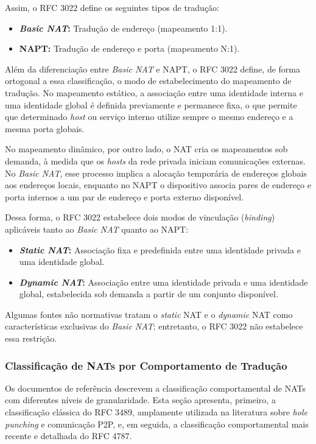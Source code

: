 Assim, o RFC 3022 define os seguintes tipos de tradução:
\begin{itemize}
    \item \textbf{\textit{Basic NAT}:} Tradução de endereço (mapeamento 1:1).
    \item \textbf{NAPT:} Tradução de endereço e porta (mapeamento N:1).
\end{itemize}

Além da diferenciação entre \textit{Basic NAT} e NAPT, o RFC 3022 define, de forma ortogonal a essa classificação, o modo de estabelecimento do mapeamento de tradução. No mapeamento estático, a associação entre uma identidade interna e uma identidade global é definida previamente e permanece fixa, o que permite que determinado \textit{host} ou serviço interno utilize sempre o mesmo endereço e a mesma porta globais.

No mapeamento dinâmico, por outro lado, o NAT cria os mapeamentos sob demanda, à medida que os \textit{hosts} da rede privada iniciam comunicações externas. No \textit{Basic NAT}, esse processo implica a alocação temporária de endereços globais aos endereços locais, enquanto no NAPT o dispositivo associa pares de endereço e porta internos a um par de endereço e porta externo disponível.

Dessa forma, o RFC 3022 estabelece dois modos de vinculação (\textit{binding}) aplicáveis tanto ao \textit{Basic NAT} quanto ao NAPT:
\begin{itemize}
    \item \textbf{\textit{Static NAT}:} Associação fixa e predefinida entre uma identidade privada e uma identidade global.
    \item \textbf{\textit{Dynamic NAT}:} Associação entre uma identidade privada e uma identidade global, estabelecida sob demanda a partir de um conjunto disponível.
\end{itemize}

Algumas fontes não normativas tratam o \textit{static} NAT e o \textit{dynamic} NAT como características exclusivas do \textit{Basic NAT}; entretanto, o RFC 3022 não estabelece essa restrição.

\subsubsection{Classificação de NATs por Comportamento de Tradução}
\label{sec:nat_classification_by_translation_behavior}

Os documentos de referência descrevem a classificação comportamental de NATs com diferentes níveis de granularidade. Esta seção apresenta, primeiro, a classificação clássica do RFC 3489, amplamente utilizada na literatura sobre \textit{hole punching} e comunicação P2P, e, em seguida, a classificação comportamental mais recente e detalhada do RFC 4787.

